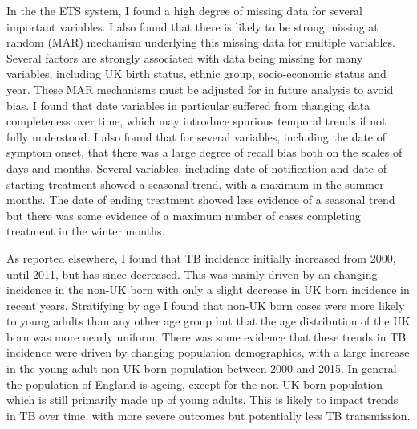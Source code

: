 \documentclass[11pt,twoside]{bristolthesis}
\begin{document}
  In the the ETS system, I found a high degree of missing data for several important variables. I also found that there is likely to be strong missing at random (MAR) mechanism underlying this missing data for multiple variables. Several factors are strongly associated with data being missing for many variables, including UK birth status, ethnic group, socio-economic status and year. These MAR mechanisms must be adjusted for in future analysis to avoid bias. I found that date variables in particular suffered from changing data completeness over time, which may introduce spurious temporal trends if not fully understood. I also found that for several variables, including the date of symptom onset, that there was a large degree of recall bias both on the scales of days and months. Several variables, including date of notification and date of starting treatment showed a seasonal trend, with a maximum in the summer months. The date of ending treatment showed less evidence of a seasonal trend but there was some evidence of a maximum number of cases completing treatment in the winter months.
  
  As reported elsewhere, I found that TB incidence initially increased from 2000, until 2011, but has since decreased. This was mainly driven by an changing incidence in the non-UK born with only a slight decrease in UK born incidence in recent years. Stratifying by age I found that non-UK born cases were more likely to young adults than any other age group but that the age distribution of the UK born was more nearly uniform. There was some evidence that these trends in TB incidence were driven by changing population demographics, with a large increase in the young adult non-UK born population between 2000 and 2015. In general the population of England is ageing, except for the non-UK born population which is still primarily made up of young adults. This is likely to impact trends in TB over time, with more severe outcomes but potentially less TB transmission.
  
\end{document}
